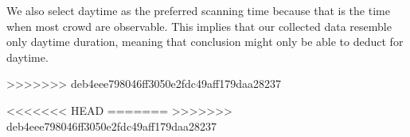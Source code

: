 We also select daytime as the preferred scanning time because that is the time when most crowd are observable. This implies that our collected data resemble only daytime duration, meaning that conclusion might only be able to deduct for daytime.

>>>>>>> deb4eee798046ff3050e2fdc49aff179daa28237

<<<<<<< HEAD
=======
>>>>>>> deb4eee798046ff3050e2fdc49aff179daa28237
